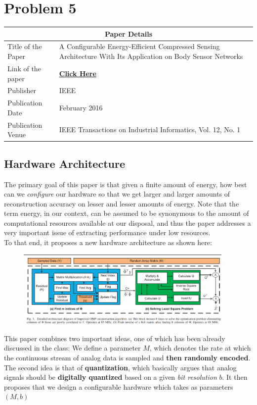 \documentclass[a4paper,11pt]{article}
\numberwithin{definition}{section}
\numberwithin{mytheorem}{subsection}
\begin{document}
\section{Problem 5}
\begin{center}
    \begin{tabular}{ |p{4cm}||p{12cm}|}
   
    \hline
    \multicolumn{2}{|c|}{Paper Details} \\
    \hline
    Title of the Paper& A Configurable Energy-Efficient Compressed
    Sensing Architecture With Its Application
    on Body Sensor Networks\\
    \hline
    Link of the paper  &  \href{https://ieeexplore.ieee.org/stamp/stamp.jsp?tp=\&arnumber=7279137\&tag=1}{\textbf{Click Here}}  \\
    \hline
    Publisher & IEEE \\
    \hline
    Publication Date   &  February 2016 \\
    \hline
    Publication Venue  & IEEE Transactions on Industrial Informatics, Vol. 12, No. 1 \\
    \hline
    
    
   \end{tabular}
\end{center}

\subsection{Hardware Architecture}
The primary goal of this paper is that given a finite amount of energy, how best can we \emph{configure} our hardware so that we get larger and larger amounts of reconstruction accuracy on lesser and lesser amounts of energy. Note that the term energy, in our context, can be assumed to be synonymous to the amount of computational resources available at our disposal, and thus the paper addresses a very important issue of extracting performance under low resources.\\
To that end, it proposes a new hardware architecture as shown here:
\begin{center}
    \begin{figure}[!h]
        \includegraphics[width=400px]{Proposed Hardware architecture.png}
    \end{figure}
\end{center}
This paper combines two important ideas, one of which has been already discussed in the class: We define a parameter $M$, which denotes the rate at which the continuous stream of analog data is sampled and \textbf{then randomly encoded}. The second idea is that of \textbf{quantization}, which basically argues that analog signals should be \textbf{digitally quantized} based on a given \emph{bit resolution} $b$. It then proposes that we design a configurable hardware which takes as parameters $(M,b)$
\end{document}

